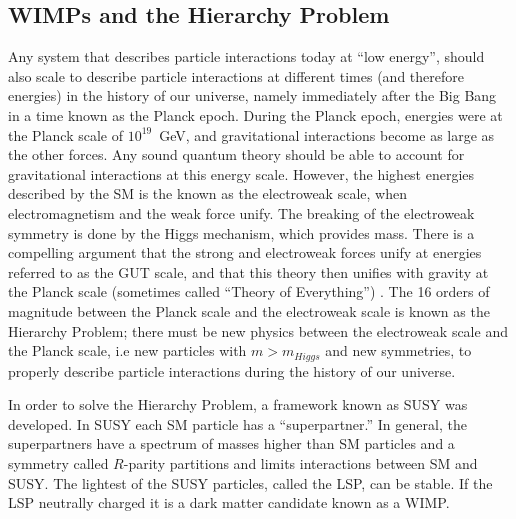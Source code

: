 \subsection{WIMPs and the Hierarchy Problem}
\label{sec:wimp_miracle}
Any system that describes particle interactions today at ``low energy'', should also scale to describe particle interactions at different times (and therefore energies) in the history of our universe, namely immediately after the Big Bang in a time known as the Planck epoch. During the Planck epoch, energies were at the Planck scale of $10^{19}$~GeV, and gravitational interactions become as large as the other forces. Any sound quantum theory should be able to account for gravitational interactions at this energy scale. However, the highest energies described by the \ac{SM} is the known as the electroweak scale, when electromagnetism and the weak force unify. The breaking of the electroweak symmetry is done by the Higgs mechanism, which provides mass. There is a compelling argument that the strong and electroweak forces unify at energies referred to as the \ac{GUT} scale, and that this theory then unifies with gravity at the Planck scale (sometimes called ``Theory of Everything'') \cite{Dimopoulos1991}. The 16 orders of magnitude between the Planck scale and the electroweak scale is known as the Hierarchy Problem; there must be new physics between the electroweak scale and the Planck scale, i.e new particles with $m > m_{Higgs}$ and new symmetries, to properly describe particle interactions during the history of our universe.

In order to solve the Hierarchy Problem, a framework known as \ac{SUSY} was developed. In \ac{SUSY} each \ac{SM} particle has a ``superpartner.'' In general, the superpartners have a spectrum of masses higher than \ac{SM} particles and a symmetry called $R$-parity partitions and limits interactions between \ac{SM} and \ac{SUSY}. The lightest of the \ac{SUSY} particles, called the \ac{LSP}, can be stable. If the \ac{LSP} neutrally charged it is a dark matter candidate known as a \ac{WIMP}.

